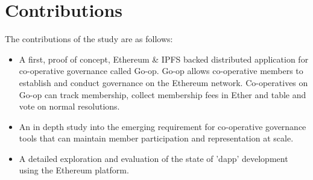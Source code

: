 \section{Contributions}
The contributions of the study are as follows:
\begin{itemize}
\item A first, proof of concept, Ethereum \& IPFS backed distributed application for co-operative governance called Go-op. Go-op allows co-operative members to establish and conduct governance on the Ethereum network. Co-operatives on Go-op can track membership, collect membership fees in Ether and table and vote on normal resolutions.
\item An in depth study into the emerging requirement for co-operative governance tools that can maintain member participation and representation at scale.
\item A detailed exploration and evaluation of the state of 'dapp' development using the Ethereum platform.
\end{itemize}


